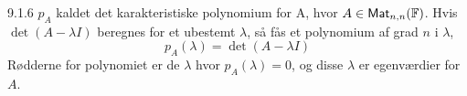\begin{notation}{9.1.6}
	$p_A$ kaldet det karakteristiske polynomium for A, hvor $A \in \textsf{Mat}_{n,n}(
	\mathbb{F})$.
	Hvis $\det(A-\lambda I)$ beregnes for et ubestemt $\lambda$, så fås et 
	polynomium af grad $n$ i $\lambda$, 
	\[
		p_A(\lambda) = \det(A-\lambda I)
	\]
	Rødderne for polynomiet er de $\lambda$ hvor $p_A(\lambda) = 0$, og disse 
	$\lambda$ er egenværdier for $A$.
\end{notation}
